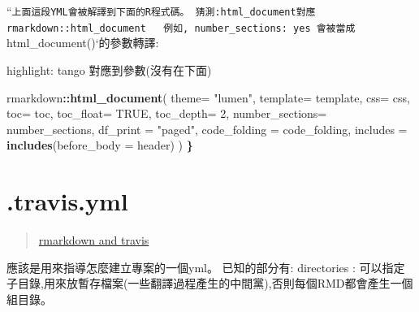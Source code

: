 \documentclass[]{book}
\newenvironment{Shaded}{\begin{snugshade}}{\end{snugshade}}
\newcommand{\KeywordTok}[1]{\textcolor[rgb]{0.13,0.29,0.53}{\textbf{#1}}}
\newcommand{\DataTypeTok}[1]{\textcolor[rgb]{0.13,0.29,0.53}{#1}}
\newcommand{\DecValTok}[1]{\textcolor[rgb]{0.00,0.00,0.81}{#1}}
\newcommand{\StringTok}[1]{\textcolor[rgb]{0.31,0.60,0.02}{#1}}
\newcommand{\OtherTok}[1]{\textcolor[rgb]{0.56,0.35,0.01}{#1}}
\newcommand{\FunctionTok}[1]{\textcolor[rgb]{0.00,0.00,0.00}{#1}}
\newcommand{\OperatorTok}[1]{\textcolor[rgb]{0.81,0.36,0.00}{\textbf{#1}}}
\newcommand{\AttributeTok}[1]{\textcolor[rgb]{0.77,0.63,0.00}{#1}}
\newcommand{\ErrorTok}[1]{\textcolor[rgb]{0.64,0.00,0.00}{\textbf{#1}}}
\newcommand{\NormalTok}[1]{#1}
\theoremstyle{definition}
\theoremstyle{definition}
\theoremstyle{definition}
\theoremstyle{remark}
\begin{document}
``\texttt{上面這段YML會被解譯到下面的R程式碼。\ 猜測:html\_document對應rmarkdown::html\_document\ \ \ 例如,\ number\_sections:\ yes\ 會被當成}html\_document()`的參數轉譯:

highlight: tango 對應到參數(沒有在下面)

\begin{Shaded}
\begin{Highlighting}[]
\NormalTok{rmarkdown}\OperatorTok{::}\KeywordTok{html_document}\NormalTok{( }\DataTypeTok{theme=} \StringTok{"lumen"}\NormalTok{,}
                               \DataTypeTok{template=}\NormalTok{ template,}
                               \DataTypeTok{css=}\NormalTok{ css,}
                               \DataTypeTok{toc=}\NormalTok{ toc,}
                               \DataTypeTok{toc_float=} \OtherTok{TRUE}\NormalTok{,}
                               \DataTypeTok{toc_depth=} \DecValTok{2}\NormalTok{,}
                               \DataTypeTok{number_sections=}\NormalTok{ number_sections,}
                               \DataTypeTok{df_print =} \StringTok{"paged"}\NormalTok{,}
                               \DataTypeTok{code_folding =}\NormalTok{ code_folding,}
                               \DataTypeTok{includes =} \KeywordTok{includes}\NormalTok{(}\DataTypeTok{before_body =}\NormalTok{ header)}
\NormalTok{                            )}
\ErrorTok{\}}
\end{Highlighting}
\end{Shaded}

\section{.travis.yml}\label{travis.yml}

\begin{quote}
\href{http://www.goring.org/resources/Adding_CI_To_RMarkdown.html}{rmarkdown
and travis}
\end{quote}

應該是用來指導怎麼建立專案的一個yml。 已知的部分有: directories :
可以指定子目錄,用來放暫存檔案(一些翻譯過程產生的中間黨),否則每個RMD都會產生一個組目錄。

\begin{Shaded}
\end{Shaded}
\end{document}
